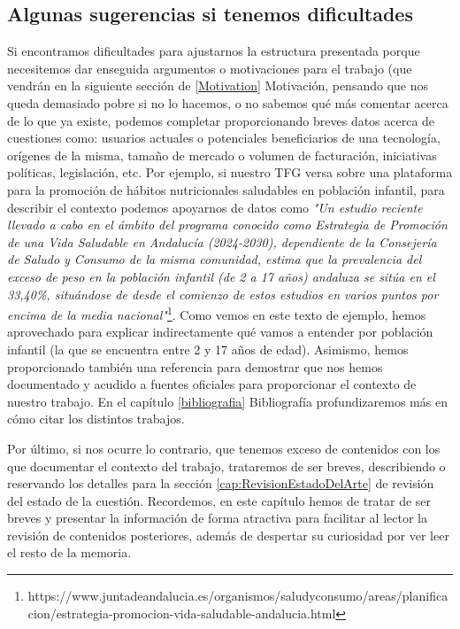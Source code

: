 \subsection{Algunas sugerencias si tenemos dificultades}
Si encontramos dificultades para ajustarnos la estructura presentada porque necesitemos dar enseguida argumentos o motivaciones para el trabajo (que vendrán en la siguiente sección de \ref{Motivation} Motivación, pensando que nos queda demasiado pobre si no lo hacemos, o no sabemos qué más comentar acerca de lo que ya existe, podemos completar proporcionando breves datos acerca de cuestiones como: usuarios actuales o potenciales beneficiarios de una tecnología, orígenes de la misma, tamaño de mercado o volumen de facturación, iniciativas políticas, legislación, etc. Por ejemplo, si nuestro TFG versa sobre una plataforma para la promoción de hábitos nutricionales saludables en población infantil, para describir el contexto podemos apoyarnos de datos como \textit{"Un estudio reciente llevado a cabo en el ámbito del programa conocido como Estrategia de Promoción de una Vida Saludable en Andalucía (2024-2030), dependiente de la Consejería de Saludo y Consumo de la misma comunidad, estima que la prevalencia del exceso de peso en la población infantil (de 2 a 17 años) andaluza se sitúa en el 33,40\%, situándose de desde el comienzo de estos estudios en varios puntos por encima de la media nacional"}\footnote{https://www.juntadeandalucia.es/organismos/saludyconsumo/areas/planificacion/estrategia-promocion-vida-saludable-andalucia.html}. Como vemos en este texto de ejemplo, hemos aprovechado para explicar indirectamente qué vamos a entender por población infantil (la que se encuentra entre 2 y 17 años de edad). Asimismo, hemos proporcionado también una referencia para demostrar que nos hemos documentado y acudido a fuentes oficiales para proporcionar el contexto de nuestro trabajo. En el capítulo  \ref{bibliografia} Bibliografía profundizaremos más en cómo citar los distintos trabajos.

Por último, si nos ocurre lo contrario, que tenemos exceso de contenidos con los que documentar el contexto del trabajo, trataremos de ser breves, describiendo o reservando los detalles para la sección \ref{cap:RevisionEstadoDelArte} de revisión del estado de la cuestión. Recordemos, en este capítulo hemos de tratar de ser breves y presentar la información de forma atractiva para facilitar al lector la revisión de contenidos posteriores, además de despertar su curiosidad por ver leer el resto de la memoria.

